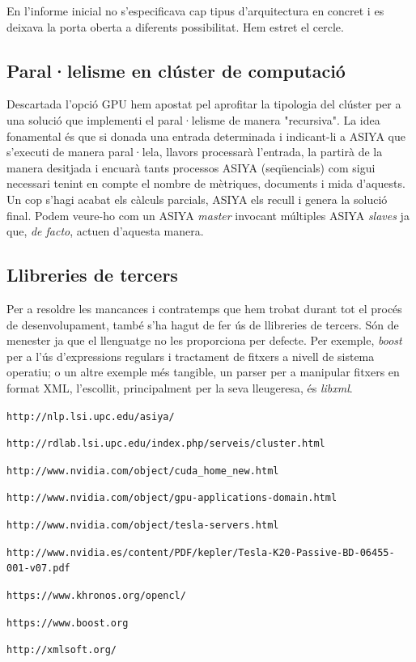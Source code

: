 \documentclass[11pt,a4paper]{article}
\begin{document}
En l'informe inicial no s'especificava cap tipus d'arquitectura en concret i es deixava la porta oberta a diferents possibilitat. Hem estret el cercle.

\subsection{Paral·lelisme en clúster de computació}

Descartada l'opció GPU hem apostat pel aprofitar la tipologia del clúster per a una solució que implementi el paral·lelisme de manera "recursiva".  La idea fonamental és que si donada una entrada determinada i indicant-li a ASIYA que s'executi de manera paral·lela, llavors processarà l'entrada, la partirà de la manera desitjada i encuarà tants processos ASIYA (seqüencials) com sigui necessari tenint en compte el nombre de mètriques, documents i mida d'aquests. Un cop s'hagi acabat els càlculs parcials, ASIYA els recull i genera la solució final. Podem veure-ho com un ASIYA \emph{master} invocant múltiples ASIYA \emph{slaves} ja que, \textit{de facto}, actuen d'aquesta manera.

\subsection{Llibreries de tercers}
Per a resoldre les mancances i contratemps que hem trobat durant tot el procés de desenvolupament, també s'ha hagut de fer ús de llibreries de tercers. Són de menester ja que el llenguatge no les proporciona per defecte. Per exemple, \textit{boost}\cite{boost} per a l'ús d'expressions regulars i tractament de fitxers a nivell de sistema operatiu; o un altre exemple més tangible, un parser per a manipular fitxers en format XML, l'escollit, principalment per la seva lleugeresa, és \textit{libxml}\cite{libxml}.

\newpage
\begin{thebibliography}{10}
\texttt{http://nlp.lsi.upc.edu/asiya/}

\texttt{http://rdlab.lsi.upc.edu/index.php/serveis/cluster.html}

\texttt{http://www.nvidia.com/object/cuda\_home\_new.html}

\texttt{http://www.nvidia.com/object/gpu-applications-domain.html}

\texttt{http://www.nvidia.com/object/tesla-servers.html}

\texttt{http://www.nvidia.es/content/PDF/kepler/Tesla-K20-Passive-BD-06455-001-v07.pdf}

\texttt{https://www.khronos.org/opencl/}

\texttt{https://www.boost.org}

\texttt{http://xmlsoft.org/}
\end{thebibliography}
\end{document}
